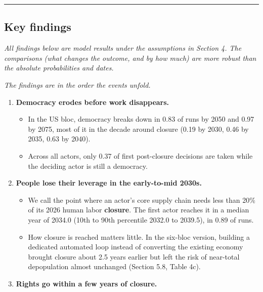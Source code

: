 \documentclass[
  10pt,
]{article}
\providecommand{\tightlist}{%
  \setlength{\itemsep}{0pt}\setlength{\parskip}{0pt}}
\begin{document}
\begin{center}\rule{0.5\linewidth}{0.5pt}\end{center}

\subsection{Key findings}\label{key-findings}

\emph{All findings below are model results under the assumptions in Section 4. The comparisons (what
changes the outcome, and by how much) are more robust than the absolute probabilities and dates.}

\emph{The findings are in the order the events unfold.}

\begin{enumerate}
\def\labelenumi{\arabic{enumi}.}
\tightlist
\item
  \textbf{Democracy erodes before work disappears.}

  \begin{itemize}
  \tightlist
  \item
    In the US bloc, democracy breaks down in 0.83 of runs by 2050 and 0.97 by 2075, most of it in
    the decade around closure (0.19 by 2030, 0.46 by 2035, 0.63 by 2040).
  \item
    Across all actors, only 0.37 of first post-closure decisions are taken while the deciding actor
    is still a democracy.
  \end{itemize}
\item
  \textbf{People lose their leverage in the early-to-mid 2030s.}

  \begin{itemize}
  \tightlist
  \item
    We call the point where an actor's core supply chain needs less than 20\% of its 2026 human
    labor \textbf{closure}. The first actor reaches it in a median year of 2034.0 (10th to 90th
    percentile 2032.0 to 2039.5), in 0.89 of runs.
  \item
    How closure is reached matters little. In the six-bloc version, building a dedicated automated
    loop instead of converting the existing economy brought closure about 2.5 years earlier but left
    the risk of near-total depopulation almost unchanged (Section 5.8, Table 4c).
  \end{itemize}
\item
  \textbf{Rights go within a few years of closure.}


\end{enumerate}
\end{document}
